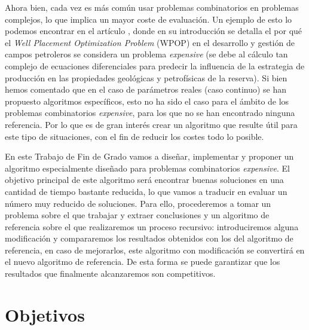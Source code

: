 Ahora bien, cada vez es más común usar problemas combinatorios en problemas complejos, lo que implica un mayor coste de evaluación. 
Un ejemplo de esto lo podemos encontrar en el artículo \parencite{demoraesDiversityPreservationMethod2022}, donde en su introducción se detalla el por qué el \textit{Well Placement Optimization Problem} (WPOP) en el desarrollo y gestión de campos petroleros se considera un problema \textit{expensive} (se debe al cálculo tan complejo de ecuaciones diferenciales para predecir la influencia de la estrategia de producción  en las propiedades geológicas y petrofísicas de la reserva). 
Si bien hemos comentado que en el caso de parámetros reales (caso continuo) se han propuesto algoritmos específicos, esto no ha sido el caso para el ámbito de los problemas combinatorios \textit{expensive}, para los que no se han encontrado ninguna referencia. 
Por lo que es de gran interés crear un algoritmo que resulte útil para este tipo de situaciones, con el fin de reducir los costes todo lo posible. 

En este Trabajo de Fin de Grado vamos a diseñar, implementar y proponer un algoritmo especialmente diseñado para problemas combinatorios \textit{expensive}. 
El objetivo principal de este algoritmo será encontrar buenas soluciones en una cantidad de tiempo bastante reducida, lo que vamos a traducir en evaluar un número muy reducido de soluciones. 
Para ello, procederemos a tomar un problema sobre el que trabajar y extraer conclusiones y un algoritmo de referencia sobre el que realizaremos un proceso recursivo: introduciremos alguna modificación y compararemos los resultados obtenidos con los del algoritmo de referencia, en caso de mejorarlos, este algoritmo con modificación se convertirá en el nuevo algoritmo de referencia. 
De esta forma se puede garantizar que los resultados que finalmente alcanzaremos son competitivos. 

\section{Objetivos}

